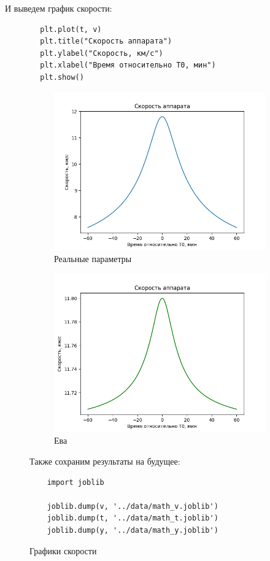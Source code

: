 \documentclass{article}
\begin{document}
    И выведем график скорости:
    \begin{verbatim}
        plt.plot(t, v)
        plt.title("Скорость аппарата")
        plt.ylabel("Скорость, км/с")
        plt.xlabel("Время относительно T0, мин")
        plt.show()
    \end{verbatim}
    \begin{figure}[H]
        \begin{subfigure}{0.5\textwidth}
            \includegraphics[width=1\linewidth]{images/speed_graph.png}
            \caption{Реальные параметры}
        \end{subfigure}
        \begin{subfigure}{0.5\textwidth}
            \includegraphics[width=1\linewidth]{images/eve_speed.png}
            \caption{Ева}
        \end{subfigure}
    \caption{Графики скорости}
    Также сохраним результаты на будущее:
    \begin{verbatim}
    import joblib

    joblib.dump(v, '../data/math_v.joblib')
    joblib.dump(t, '../data/math_t.joblib')
    joblib.dump(y, '../data/math_y.joblib')
    \end{verbatim}
    \end{figure}
\end{document}
